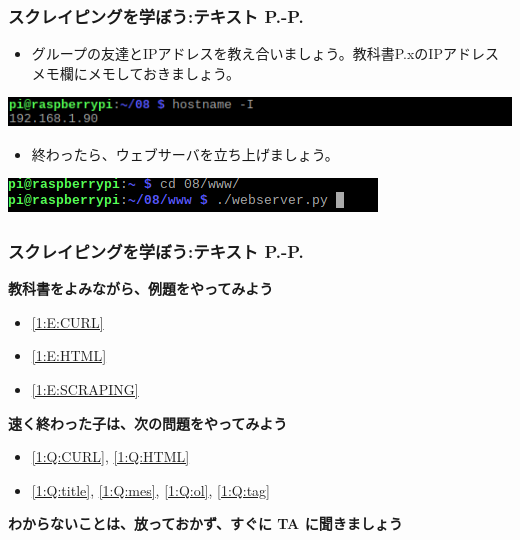\documentclass[dvipdfmx]{beamer}
\begin{document}
\begin{frame}[fragile]
	\frametitle{スクレイピングを学ぼう:テキスト P.\pageref{1:P:intro}-P.\pageref{1:P:charCode}~~~}
        \begin{itemize}
            \item グループの友達とIPアドレスを教え合いましょう。教科書P.xのIPアドレスメモ欄にメモしておきましょう。
        \end{itemize}
        \begin{minipage}{\textwidth}
            {\upshape
              \includegraphics[width=\textwidth]{slide08-img001.png}}
        \end{minipage}
        \begin{itemize}
            \item 終わったら、ウェブサーバを立ち上げましょう。
        \end{itemize}
        \begin{minipage}{\textwidth}
            {\upshape
              \includegraphics[width=\textwidth]{textbook-img003.png}}
        \end{minipage}
\end{frame}

\begin{frame}[fragile]
	\frametitle{スクレイピングを学ぼう:テキスト P.\pageref{1:P:intro}-P.\pageref{1:P:charCode}~~~}
      \large\textbf{教科書をよみながら、例題をやってみよう}
				\begin{itemize}
					\item \ref*{1:E:CURL}
					\item \ref*{1:E:HTML}
					\item \ref*{1:E:SCRAPING}
				\end{itemize}
      \vfill
      \large\textbf{速く終わった子は、次の問題をやってみよう}
				\begin{itemize}
					\item \ref*{1:Q:CURL}, \ref*{1:Q:HTML}
					\item \ref*{1:Q:title}, \ref*{1:Q:mes}, \ref*{1:Q:ol}, \ref*{1:Q:tag}
				\end{itemize}
      \vfill
      \large\textbf{わからないことは、放っておかず、すぐに TA に聞きましょう}
\end{frame}
\end{document}

